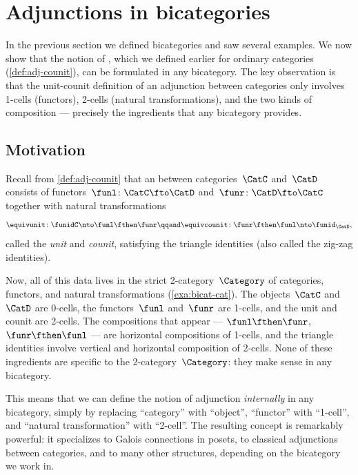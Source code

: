 
\section{Adjunctions in bicategories}
\label{sec:bicats-adjunctions}

In the previous section we defined bicategories and saw several examples.
We now show that the notion of , which we defined earlier for ordinary categories (\cref{def:adj-counit}), can be formulated in any bicategory.
The key observation is that the unit-counit definition of an adjunction between categories only involves 1-cells (functors), 2-cells (natural transformations), and the two kinds of composition --- precisely the ingredients that any bicategory provides.

\subsection{Motivation}

Recall from \cref{def:adj-counit} that an  between categories~$\CatC$ and~$\CatD$ consists of functors~$\funl \colon \CatC \fto \CatD$ and~$\funr \colon \CatD \fto \CatC$ together with natural transformations
\begin{equation}
    \equivunit \colon \funidC \nto \funl \fthen \funr \qqand \equivcounit \colon \funr \fthen \funl \nto \funid_\CatD,
\end{equation}
called the \emph{unit} and \emph{counit}, satisfying the triangle identities (also called the zig-zag identities).

Now, all of this data lives in the strict 2-category~$\Category$ of categories, functors, and natural transformations (\cref{exa:bicat-cat}).
The objects~$\CatC$ and~$\CatD$ are 0-cells, the functors~$\funl$ and~$\funr$ are 1-cells, and the unit and counit are 2-cells.
The compositions that appear --- $\funl \fthen \funr$, $\funr \fthen \funl$ --- are horizontal compositions of 1-cells, and the triangle identities involve vertical and horizontal composition of 2-cells.
None of these ingredients are specific to the 2-category~$\Category$: they make sense in any bicategory.

This means that we can define the notion of adjunction \emph{internally} in any bicategory, simply by replacing ``category'' with ``object'', ``functor'' with ``1-cell'', and ``natural transformation'' with ``2-cell''.
The resulting concept is remarkably powerful: it specializes to Galois connections in posets, to classical adjunctions between categories, and to many other structures, depending on the bicategory we work in.

